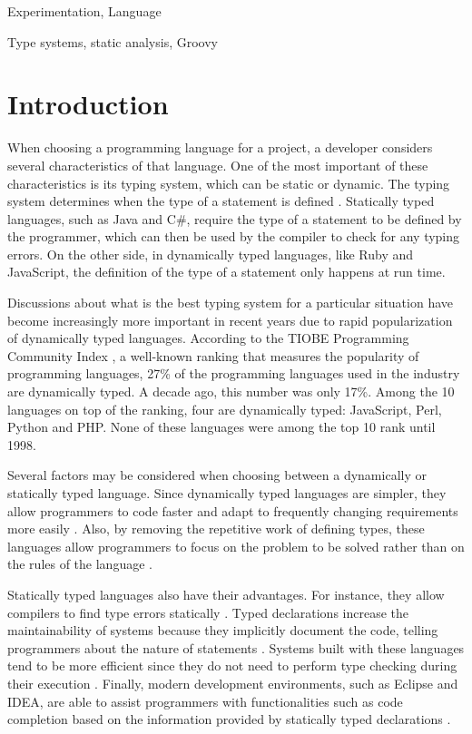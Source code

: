 \documentclass[preprint]{sigplanconf}
\begin{document}

\terms
Experimentation, Language

\keywords
Type systems, static analysis, Groovy

\section{Introduction}
When choosing a programming language for a project, a developer considers several characteristics of that language.
One of the most important of these characteristics is its typing system, which can be static or dynamic.
The typing system determines when the type of a statement is defined \cite{types_and_programming_languages}. 
Statically typed languages, such as Java and C\#, require the type of a statement to be defined by the programmer, which can then be used by the compiler to check for any typing errors. 
On the other side, in dynamically typed languages, like Ruby and JavaScript, the definition of the type of a statement only happens at run time.

Discussions about what is the best typing system for a particular situation have become increasingly more important in recent years due to rapid popularization of dynamically typed languages. 
According to the TIOBE Programming Community Index \cite{tiobe}, a well-known ranking that measures the popularity of programming languages, 27\% of the programming languages used in the industry are dynamically typed. 
A decade ago, this number was only 17\%. 
Among the 10 languages on top of the ranking, four are dynamically typed: JavaScript, Perl, Python and PHP. 
None of these languages were among the top 10 rank until 1998.

Several factors may be considered when choosing between a dynamically or statically typed language. 
Since dynamically typed languages are simpler, they allow programmers to code faster \cite{types_and_programming_languages} and adapt to frequently changing requirements more easily \cite{gradual_typing}.
Also, by removing the repetitive work of defining types, these languages allow programmers to focus on the problem to be solved rather than on the rules of the language \cite{dynamically_typed_languages}.

Statically typed languages also have their advantages. 
For instance, they allow compilers to find type errors statically \cite{should_your_specification_language_be_typed}. 
Typed declarations increase the maintainability of systems because they implicitly document the code, telling programmers about the nature of statements \cite{type_systems,mayer2012static}. 
Systems built with these languages tend to be more efficient since they do not need to perform type checking during their execution \cite{bruce2002foundations,jit}. 
Finally, modern development environments, such as Eclipse and IDEA, are able to assist programmers with functionalities such as code completion based on the information provided by statically typed declarations \cite{bruch2009learning}.
\end{document}
